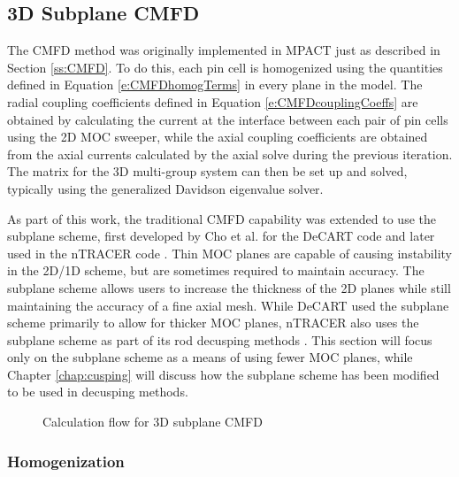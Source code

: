 \subsection{3D Subplane CMFD}\label{ss:2d1d-3dcmfd}

The CMFD method was originally implemented in MPACT just as described in Section \ref{ss:CMFD}.  To do this, each pin cell is homogenized using the quantities defined in Equation \ref{e:CMFDhomogTerms} in every plane in the model.  The radial coupling coefficients defined in Equation \ref{e:CMFDcouplingCoeffs} are obtained by calculating the current at the interface between each pair of pin cells using the 2D MOC sweeper, while the axial coupling coefficients are obtained from the axial currents calculated by the axial solve during the previous iteration.  The matrix for the 3D multi-group system can then be set up and solved, typically using the generalized Davidson eigenvalue solver.

As part of this work, the traditional CMFD capability was extended to use the subplane scheme, first developed by Cho et al. for the DeCART code \cite{DeCARTsubplane} and later used in the nTRACER code \cite{RyuBEAVRSnTRACER2015}.  Thin MOC planes are capable of causing instability in the 2D/1D scheme, but are sometimes required to maintain accuracy.  The subplane scheme allows users to increase the thickness of the 2D planes while still maintaining the accuracy of a fine axial mesh.  While DeCART used the subplane scheme primarily to allow for thicker MOC planes, nTRACER also uses the subplane scheme as part of its rod decusping methods \cite{ICAPPcontrolRodDecuspingNTRACER}.  This section will focus only on the subplane scheme as a means of using fewer MOC planes, while Chapter \ref{chap:cusping} will discuss how the subplane scheme has been modified to be used in decusping methods.

\begin{figure}[h]
  \centering
  
  \caption{Calculation flow for 3D subplane CMFD}\label{f:CMFD-flowchart}
\end{figure}

\subsubsection{Homogenization}

